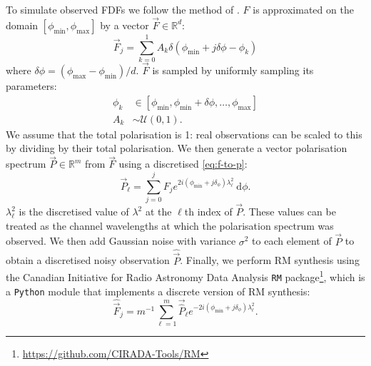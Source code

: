     To simulate observed FDFs we follow the method of \citet{brown_classifying_2018}. $F$ is approximated on the domain $[\phi_{\min}, \phi_{\max}]$ by a vector $\vec F \in \mathbb R^d$:
    \begin{equation}
      \label{eq:vec-f}
      \vec F_j = \sum_{k = 0}^1 A_k \delta(\phi_{\min} + j \delta \phi - \phi_k)
    \end{equation}
    where $\delta\phi = (\phi_{\max} - \phi_{\min}) / d$.
    $\vec F$ is sampled by uniformly sampling its parameters:
    \begin{align}
      \label{eq:model-distributions}
      \phi_k &\in [\phi_{\min}, \phi_{\min} + \delta\phi, \dots, \phi_{\max}]\\
      A_k &\sim \mathcal U(0, 1).
    \end{align}
    We assume that the total polarisation is 1: real observations can be scaled to this by dividing by their total polarisation. We then generate a vector polarisation spectrum $\vec P \in \mathbb R^m$ from $\vec F$ using a discretised \autoref{eq:f-to-p}:
    \begin{equation}
      \label{eq:discrete-f-to-p}
      \vec P_\ell = \sum_{j = 0}^{j} F_j e^{2i(\phi_{\min} + j\delta_\phi)\lambda^2_\ell}\ \mathrm{d}\phi.
    \end{equation}
    $\lambda^2_\ell$ is the discretised value of $\lambda^2$ at the $\ell$th index of $\vec P$. These values can be treated as the channel wavelengths at which the polarisation spectrum was observed. We then add Gaussian noise with variance $\sigma^2$ to each element of $\vec P$ to obtain a discretised noisy observation $\hat{\vec{P}}$. Finally, we perform RM synthesis using the Canadian Initiative for Radio Astronomy Data Analysis \texttt{RM} package\footnote{\url{https://github.com/CIRADA-Tools/RM}}, which is a \texttt{Python} module that implements a discrete version of RM synthesis:
    \begin{equation}
      \label{eq:discrete-rm-synthesis}
      \hat{\vec{F}}_j = m^{-1} \sum_{\ell = 1}^m \vec{\hat P}_\ell e^{-2i(\phi_{\min} + j\delta_\phi)\lambda^2_\ell}.
    \end{equation}

